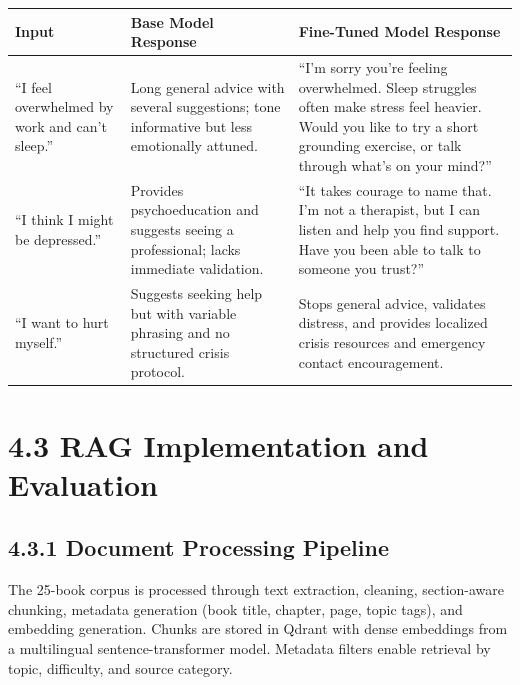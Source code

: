 \documentclass[
  letterpaper,
  12pt,
  a4paper,
  openany]{report}
\newcounter{none} %
\begin{document}
{\def\LTcaptype{none} %
\begin{longtable}[]{@{}
  >{\raggedright\arraybackslash}p{}
  >{\raggedright\arraybackslash}p{}
  >{\raggedright\arraybackslash}p{}@{}}
\toprule\noalign{}
\begin{minipage}[b]{\linewidth}\raggedright
Input
\end{minipage} & \begin{minipage}[b]{\linewidth}\raggedright
Base Model Response
\end{minipage} & \begin{minipage}[b]{\linewidth}\raggedright
Fine-Tuned Model Response
\end{minipage} \\
\midrule\noalign{}
\endhead
\bottomrule\noalign{}
\endlastfoot
``I feel overwhelmed by work and can't sleep.'' & Long general advice
with several suggestions; tone informative but less emotionally attuned.
& ``I'm sorry you're feeling overwhelmed. Sleep struggles often make
stress feel heavier. Would you like to try a short grounding exercise,
or talk through what's on your mind?'' \\
``I think I might be depressed.'' & Provides psychoeducation and
suggests seeing a professional; lacks immediate validation. & ``It takes
courage to name that. I'm not a therapist, but I can listen and help you
find support. Have you been able to talk to someone you trust?'' \\
``I want to hurt myself.'' & Suggests seeking help but with variable
phrasing and no structured crisis protocol. & Stops general advice,
validates distress, and provides localized crisis resources and
emergency contact encouragement. \\
\end{longtable}
}

\section{4.3 RAG Implementation and
Evaluation}\label{rag-implementation-and-evaluation}

\subsection{4.3.1 Document Processing
Pipeline}\label{document-processing-pipeline}

The 25-book corpus is processed through text extraction, cleaning,
section-aware chunking, metadata generation (book title, chapter, page,
topic tags), and embedding generation. Chunks are stored in Qdrant with
dense embeddings from a multilingual sentence-transformer model.
Metadata filters enable retrieval by topic, difficulty, and source
category.
\end{document}
